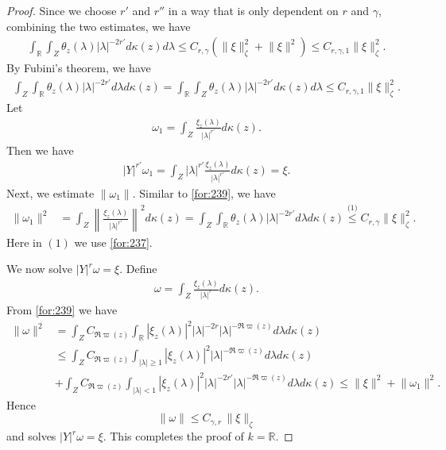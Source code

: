 \documentclass[11 pt]{amsart}
\newcommand{\RR}{\mathbb{R}}
\newcommand{\R}{\mathbb{R}}
\newcommand{\norm}[1]{\lVert#1\rVert}
\theoremstyle{definition}
\numberwithin{equation}{section}
\begin{document}
\begin{proof}
Since we choose $r'$ and $r''$ in a way that is only dependent on $r$ and $\gamma$, combining the two estimates, we have
\begin{align*}
 \int_{\R}\int_Z\theta_z(\lambda)|\lambda|^{-2r'} d\kappa(z)d\lambda\leq C_{r,\gamma}(\big\|\xi\big\|_{\zeta}^2+\big\|\xi\big\|^2)\leq C_{r,\gamma,1}\big\|\xi\big\|_{\zeta}^2.
\end{align*}
By Fubini's theorem, we have
\begin{align}\label{for:237}
 \int_Z \int_{\R}\theta_z(\lambda)|\lambda|^{-2r'} d\lambda d\kappa(z)=\int_{\R}\int_Z\theta_z(\lambda)|\lambda|^{-2r'} d\kappa(z)d\lambda\leq C_{r,\gamma,1}\big\|\xi\big\|_{\zeta}^2.
\end{align}
Let
\begin{align*}
 \omega_1=\int_Z \frac{\xi_z(\lambda)}{|\lambda|^{r'}} d\kappa(z).
\end{align*}
Then we have
\begin{align*}
    |Y|^{r'}\omega_1=\int_Z |\lambda|^{r'}\frac{\xi_z(\lambda)}{|\lambda|^{r'}} d\kappa(z)=\xi.
  \end{align*}
Next, we estimate $\norm{\omega_1}$. Similar to \eqref{for:239}, we have
\begin{align*}
  \norm{\omega_1}^2&=  \int_Z \left\|\frac{\xi_z(\lambda)}{|\lambda|^{r'}}\right\|^2 d\kappa(z)=\int_Z\int_{\R}\theta_z(\lambda)|\lambda|^{-2r'}d\lambda d\kappa(z)\overset{\text{(1)}}{\leq} C_{r,\gamma}\big\|\xi\big\|_{\zeta}^2.
\end{align*}
Here in $(1)$ we use \eqref{for:237}.

We now solve $|Y|^{r}\omega=\xi$. Define
\begin{align*}
 \omega=\int_Z \frac{\xi_z(\lambda)}{|\lambda|^{r}} d\kappa(z).
\end{align*}
From \eqref{for:239} we have
\begin{align*}
 \norm{\omega}^2&=\int_Z C_{\Re\varpi(z)} \int_{\R} |\xi_z(\lambda)|^2|\lambda|^{-2r} \vert \lambda\vert^{-\Re\varpi(z)} d\lambda d\kappa(z)\\
&\leq \int_Z C_{\Re\varpi(z)} \int_{|\lambda|\geq1} |\xi_z(\lambda)|^2 \vert \lambda\vert^{-\Re\varpi(z)} d\lambda d\kappa(z)\\
&+\int_Z C_{\Re\varpi(z)}
\int_{|\lambda|<1} |\xi_z(\lambda)|^2|\lambda|^{-2r'} \vert \lambda\vert^{-\Re\varpi(z)} d\lambda d\kappa(z)\leq \norm{\xi}^2+\norm{\omega_1}^2.
\end{align*}
Hence
\[
 \|\omega\|\leq C_{\gamma,r}\,\|\xi\|_{\zeta}
\]
and solves $|Y|^{r}\omega=\xi$. This completes the proof of $k=\RR$.


\end{proof}
\end{document}
